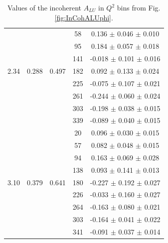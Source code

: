 \documentclass[aps,prc,preprint,superscriptaddress]{revtex4}
\begin{document}
\begin{table}[!h]
\begin{center}
\begin{tabular}{|c|c|c|c|c|}
        &       &        &   58   &   0.136  $\pm$  0.046   $\pm$ 0.010  \\
        &       &        &   95   &   0.184  $\pm$  0.057   $\pm$ 0.018  \\
        &       &        &  141   &  -0.018  $\pm$  0.101   $\pm$ 0.016  \\
  2.34  & 0.288 & 0.497  &  182   &   0.092  $\pm$  0.133   $\pm$ 0.024  \\
        &       &        &  225   &  -0.075  $\pm$  0.107   $\pm$ 0.021  \\
        &       &        &  261   &  -0.244  $\pm$  0.060   $\pm$ 0.024  \\
        &       &        &  303   &  -0.198  $\pm$  0.038   $\pm$ 0.015  \\
        &       &        &  339   &  -0.089  $\pm$  0.040   $\pm$ 0.015  \\
  \hline 
        &       &        &   20   &   0.096  $\pm$  0.030   $\pm$ 0.015  \\ 
        &       &        &   57   &   0.082  $\pm$  0.048   $\pm$ 0.015  \\
        &       &        &   94   &   0.163  $\pm$  0.069   $\pm$ 0.028  \\
        &       &        &  138   &   0.093  $\pm$  0.141   $\pm$ 0.013  \\
  3.10  & 0.379 & 0.641  &  180   &  -0.227  $\pm$  0.192   $\pm$ 0.027  \\
        &       &        &  226   &  -0.033  $\pm$  0.160   $\pm$ 0.027  \\
        &       &        &  264   &  -0.163  $\pm$  0.080   $\pm$ 0.021  \\
        &       &        &  303   &  -0.164  $\pm$  0.041   $\pm$ 0.022  \\
        &       &        &  341   &  -0.091  $\pm$  0.037   $\pm$ 0.014  \\
 \hline
      \end{tabular}
      \caption{Values of the incoherent $A_{LU}$ in $Q^2$ bins from Fig. \ref{fig:InCohALUphi}.}
      \label{table:InCoh_Q2_BSA}
   \end{center}
\end{table}
\end{document}

